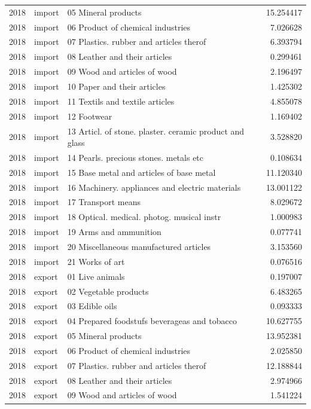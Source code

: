 \begin{tabular}{rllr}
2018 & import & 05 Mineral products & 15.254417 \\
2018 & import & 06 Product of chemical industries & 7.026628 \\
2018 & import & 07 Plastics. rubber and articles therof & 6.393794 \\
2018 & import & 08 Leather and their articles & 0.299461 \\
2018 & import & 09 Wood and articles of wood & 2.196497 \\
2018 & import & 10 Paper and their articles & 1.425302 \\
2018 & import & 11 Textils and textile articles & 4.855078 \\
2018 & import & 12 Footwear & 1.169402 \\
2018 & import & 13 Articl. of stone. plaster. ceramic product and glass & 3.528820 \\
2018 & import & 14 Pearls. precious stones. metals etc & 0.108634 \\
2018 & import & 15 Base metal and articles of base metal & 11.120340 \\
2018 & import & 16 Machinery. appliances and electric materials & 13.001122 \\
2018 & import & 17 Transport means & 8.029672 \\
2018 & import & 18 Optical. medical. photog. musical instr & 1.000983 \\
2018 & import & 19 Arms and ammunition & 0.077741 \\
2018 & import & 20 Miscellaneous manufactured articles & 3.153560 \\
2018 & import & 21 Works of art & 0.076516 \\
2018 & export & 01 Live animals & 0.197007 \\
2018 & export & 02 Vegetable products & 6.483265 \\
2018 & export & 03 Edible oils & 0.093333 \\
2018 & export & 04 Prepared foodstufs beverageas and tobacco & 10.627755 \\
2018 & export & 05 Mineral products & 13.952381 \\
2018 & export & 06 Product of chemical industries & 2.025850 \\
2018 & export & 07 Plastics. rubber and articles therof & 12.188844 \\
2018 & export & 08 Leather and their articles & 2.974966 \\
2018 & export & 09 Wood and articles of wood & 1.541224 \\

\end{tabular}
